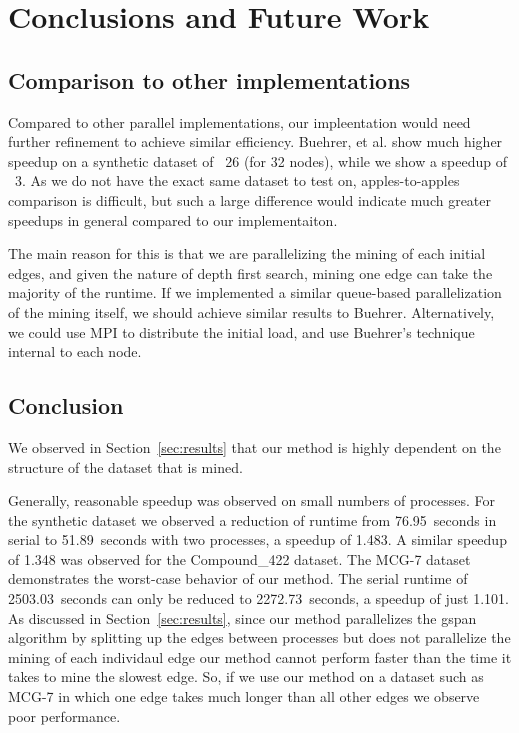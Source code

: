 \section{Conclusions and Future Work}
\label{sec:conclusions}

\subsection{Comparison to other implementations}
\label{subsec:comparison}

Compared to other parallel implementations, our impleentation would need
further refinement to achieve similar efficiency.  Buehrer, et al. show
much higher speedup on a synthetic dataset of ~26 (for 32 nodes), while 
we show a speedup of ~3.  As we do not have the exact same dataset to test
on, apples-to-apples comparison is difficult, but such a large difference
would indicate much greater speedups in general compared to our 
implementaiton.   

The main reason for this is that we are parallelizing the mining of each 
initial edges, and given the nature of depth first search, mining one edge 
can take the majority of the runtime.  If we implemented a similar 
queue-based parallelization of the mining itself, we should achieve similar 
results to Buehrer.  Alternatively, we could use MPI to distribute the 
initial load, and use Buehrer's technique internal to each node.  

\subsection{Conclusion}
\label{subsec:conclusions}

We observed in Section~\ref{sec:results} that our method is highly dependent
on the structure of the dataset that is mined.

Generally, reasonable speedup was observed on small numbers of processes. For
the synthetic dataset we observed a reduction of runtime from 76.95~seconds
in serial to 51.89~seconds with two processes, a speedup of 1.483. A similar
speedup of 1.348 was observed for the Compound\_422 dataset. The MCG-7 dataset
demonstrates the worst-case behavior of our method. The serial runtime of
2503.03~seconds can only be reduced to 2272.73~seconds, a speedup of just
1.101. As discussed in Section~\ref{sec:results}, since our method
parallelizes the gspan algorithm by splitting up the edges between processes
but does not parallelize the mining of each individaul edge our method cannot
perform faster than the time it takes to mine the slowest edge. So, if we
use our method on a dataset such as MCG-7 in which one edge takes much longer
than all other edges we observe poor performance.

